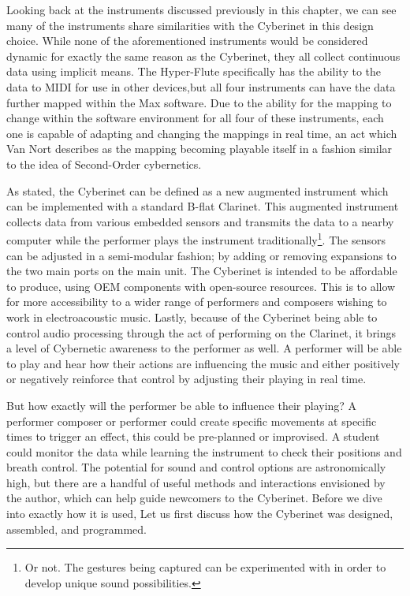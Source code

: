 Looking back at the instruments discussed previously in this chapter, we can see many of the instruments share similarities with the Cyberinet in this design choice. While none of the aforementioned instruments would be considered dynamic for exactly the same reason as the Cyberinet, they all collect continuous data using implicit means. The Hyper-Flute specifically has the ability to the data to MIDI for use in other devices,but all four instruments can have the data further mapped within the Max software. Due to the ability for the mapping to change within the software environment for all four of these instruments, each one is capable of adapting and changing the mappings in real time, an act which Van Nort describes as the mapping becoming playable itself\cite{vanNortMapping2007} in a fashion similar to the idea of Second-Order cybernetics.

As stated, the Cyberinet can be defined as a new augmented instrument which can be implemented with a standard B-flat Clarinet. This augmented instrument collects data from various embedded sensors and transmits the data to a nearby computer while the performer plays the instrument traditionally\footnote{Or not. The gestures being captured can be experimented with in order to develop unique sound possibilities.}. The sensors can be adjusted in a semi-modular fashion; by adding or removing expansions to the two main ports on the main unit. The Cyberinet is intended to be affordable to produce, using OEM components with open-source resources. This is to allow for more accessibility to a wider range of performers and composers wishing to work in electroacoustic music. Lastly, because of the Cyberinet being able to control audio processing through the act of performing on the Clarinet, it brings a level of Cybernetic awareness to the performer as well. A performer will be able to play and hear how their actions are influencing the music and either positively or negatively reinforce that control by adjusting their playing in real time. 

But how exactly will the performer be able to influence their playing? A performer composer or performer could create specific movements at specific times to trigger an effect, this could be pre-planned or improvised. A student could monitor the data while learning the instrument to check their positions and breath control. The potential for sound and control options are astronomically high, but there are a handful of useful methods and interactions envisioned by the author, which can help guide newcomers to the Cyberinet. Before we dive into exactly how it is used, Let us first discuss how the Cyberinet was designed, assembled, and programmed.


